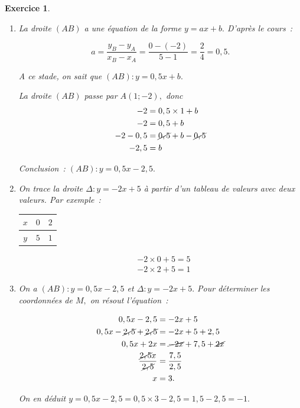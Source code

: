 \documentclass[10pt]{article}
\newtheorem{exo}{Exercice}
\begin{document}
\begin{exo}


\begin{enumerate}
\item La droite $(AB)$ a une équation de la forme $y=ax+b.$ D'après le cours~:

\[a=\frac{y_B-y_A}{x_B-x_A}=\frac{0-(-2)}{5-1}=\frac{2}{4}=0,5.\]

A ce stade, on sait que $(AB):y=0,5x+b.$

\medskip

La droite $(AB)$ passe par $A(1;-2),$ donc
\begin{align*}-2&=0,5\times 1+b\\
-2&=0,5+b\\
-2-0,5&=\cancel{0,5}+b-\cancel{0,5}\\
-2,5&=b
\end{align*}


Conclusion~: $(AB):y=0,5x-2,5.$
\item On trace la droite $\Delta:y=-2x+5$ à partir d'un tableau de valeurs avec deux valeurs. Par exemple~:

\setlength{\columnseprule}{1pt}

\begin{multicols}{2}
\begin{center}
\begin{tabular}{|c|c|c|}\hline
$x$&$0$&$2$\\ \hline
$y$&$5$&$1$\\ \hline
\end{tabular}
\end{center}
\columnbreak
\begin{align*}
&-2\times 0+5=5\\
&-2\times 2+5=1\end{align*}
\end{multicols}
\item On a $(AB):y=0,5x-2,5$ et $\Delta:y=-2x+5.$ Pour déterminer les coordonnées de $M,$ on résout l'équation~:

\begin{align*}
0,5x-2,5&=-2x+5\\
0,5x-\cancel{2,5}+\cancel{2,5}&=-2x+5+2,5\\
0,5x+2x&=\cancel{-2x}+7,5+\cancel{2x}\\
\frac{\cancel{2,5}x}{\cancel{2,5}}&=\frac{7,5}{2,5}\\
x&=3.
\end{align*}

On en déduit $y=0,5x-2,5=0,5\times 3-2,5=1,5-2,5=-1.$


\end{enumerate}
\end{exo}
\end{document}
